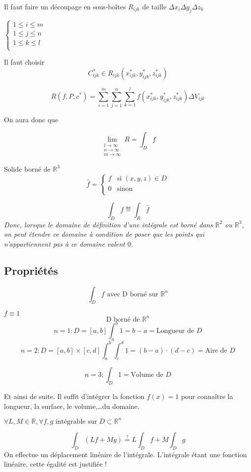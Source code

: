 Il faut faire un découpage en sous-boîtes $ R_{ijk} $ de taille $\Delta x_i \Delta y_j \Delta z_k$

$\left\{
\begin{array}{l}
1 \le i \le m \\
1 \le j \le n \\
1 \le k \le l \\
\end{array}
\right. $

Il faut choisir \[C_{ijk}^* \in R_{ijk} ( x_{ijk}^*,y_{ijk}^*,z_{ijk}^*)\]

\[R(f,P,c^*)=\sum_{i=1}^m \sum_{j=1}^n\sum_{k=1}^l f (x_{ijk}^*,y_{ijk}^*,z_{ijk}^*) \Delta V_{ijk}\]

On aura donc que

$$\lim\limits_{\substack{l \to \infty \\ n \to \infty\\ m \to \infty}} R=\int_D f$$

Solide borné de $\mathbb{R}^3$
\[\hat{f}=
\begin{cases}
f & \text{si } (x, y, z) \in D \\
0 & \text{sinon} \\
\end{cases}
\]

\[\int_D f \eqdef \int_R \hat{f}\]
\emph{
Donc, lorsque le domaine de définition d'une intégrale est borné dans $\mathbb{R}^2$ ou $\mathbb{R}^3$, on peut étendre ce domaine à condition de poser que les points qui n'appartiennent pas à ce domaine valent $0$.}
\subsection{Propriétés}

\[\int_D f \text{ avec D borné sur } \mathbb{R}^n\]

\begin{myprop}
$f\equiv 1 $
\[\text{D borné de }\mathbb{R}^n\]
\[n=1 : D=[a,b] \int_a^b 1 = b-a = \text{Longueur de }D\]
\[n=2 : D=[a,b]\times[c,d] \int_a^b \int_c^d 1 = (b-a) \cdot (d-c)= \text{Aire de }D\]

\[n=3 : \int_D 1 = \text{Volume de }D\]

Et ainsi de suite. Il suffit d'intégrer la fonction $f(x) = 1$ pour connaître la longueur, la surface, le volume,\dots du domaine.
\end{myprop}


\begin{myprop}
$\forall L,M \in \mathbb{R} ,\forall f,g \text{ intégrable sur } D \subset \mathbb{R}^n$


\[\int_D(Lf+Mg)\overset{?}{=}L\int_D f + M \int_D g\]
On effectue un déplacement linéaire de l'intégrale. L'intégrale étant une fonction linéaire, cette égalité est justifiée !

\end{myprop}


